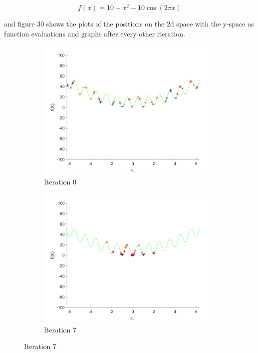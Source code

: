 $$
  f(x) = 10 + x^2 - 10 \cos(2\pi x)
$$

and figure 30 shows the plots of the positions on the 2d space with the y-space as function evaluations and graphs after every other iteration.

\begin{figure}
  \centering
  \begin{subfigure}[b]{0.4\textwidth}
    \includegraphics[width=\textwidth]{img/smpl/rast1d/loa-iter-0}
    \caption{Iteration 0}
    \label{fig:s3-iter-0}
  \end{subfigure}
  \begin{subfigure}[b]{0.4\textwidth}
    \includegraphics[width=\textwidth]{img/smpl/rast1d/loa-iter-7}
    \caption{Iteration 7}

\end{subfigure}
\end{figure}

